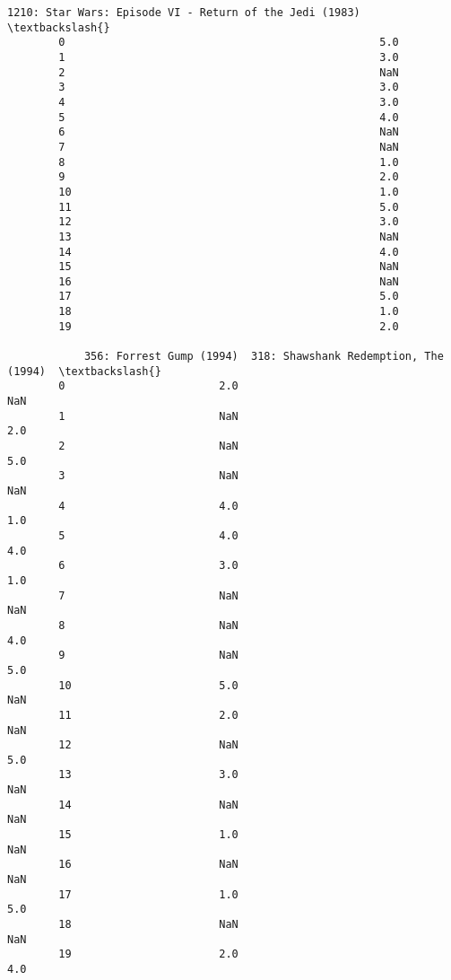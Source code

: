 \documentclass[11pt]{article}
\begin{document}
\begin{Verbatim}[commandchars=\\\{\}]
            1210: Star Wars: Episode VI - Return of the Jedi (1983)  \textbackslash{}
        0                                                 5.0         
        1                                                 3.0         
        2                                                 NaN         
        3                                                 3.0         
        4                                                 3.0         
        5                                                 4.0         
        6                                                 NaN         
        7                                                 NaN         
        8                                                 1.0         
        9                                                 2.0         
        10                                                1.0         
        11                                                5.0         
        12                                                3.0         
        13                                                NaN         
        14                                                4.0         
        15                                                NaN         
        16                                                NaN         
        17                                                5.0         
        18                                                1.0         
        19                                                2.0         
        
            356: Forrest Gump (1994)  318: Shawshank Redemption, The (1994)  \textbackslash{}
        0                        2.0                                    NaN   
        1                        NaN                                    2.0   
        2                        NaN                                    5.0   
        3                        NaN                                    NaN   
        4                        4.0                                    1.0   
        5                        4.0                                    4.0   
        6                        3.0                                    1.0   
        7                        NaN                                    NaN   
        8                        NaN                                    4.0   
        9                        NaN                                    5.0   
        10                       5.0                                    NaN   
        11                       2.0                                    NaN   
        12                       NaN                                    5.0   
        13                       3.0                                    NaN   
        14                       NaN                                    NaN   
        15                       1.0                                    NaN   
        16                       NaN                                    NaN   
        17                       1.0                                    5.0   
        18                       NaN                                    NaN   
        19                       2.0                                    4.0   
        

\end{Verbatim}
\end{document}

